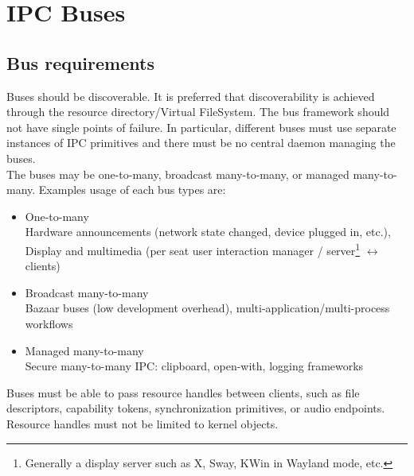 \section{IPC Buses}
\subsection{Bus requirements}
Buses should be discoverable. It is preferred that discoverability is achieved through the resource directory/Virtual FileSystem. The bus framework should not have single points of failure. In particular, different buses must use separate instances of IPC primitives and there must be no central daemon managing the buses.\\
The buses may be one-to-many, broadcast many-to-many, or managed many-to-many. Examples usage of each bus types are:
\begin{itemize}
	\item One-to-many\\
	Hardware announcements (network state changed, device plugged in, etc.), Display and multimedia (per seat user interaction manager / server\footnote{Generally a display server such as X, Sway, KWin in Wayland mode, etc.} $\leftrightarrow$ clients)
	\item Broadcast many-to-many\\
	Bazaar buses (low development overhead), multi-application/multi-process workflows
	\item Managed many-to-many\\
	Secure many-to-many IPC: clipboard, open-with, logging frameworks
\end{itemize}
Buses must be able to pass resource handles between clients, such as file descriptors, capability tokens, synchronization primitives, or audio endpoints. Resource handles must not be limited to kernel objects.
